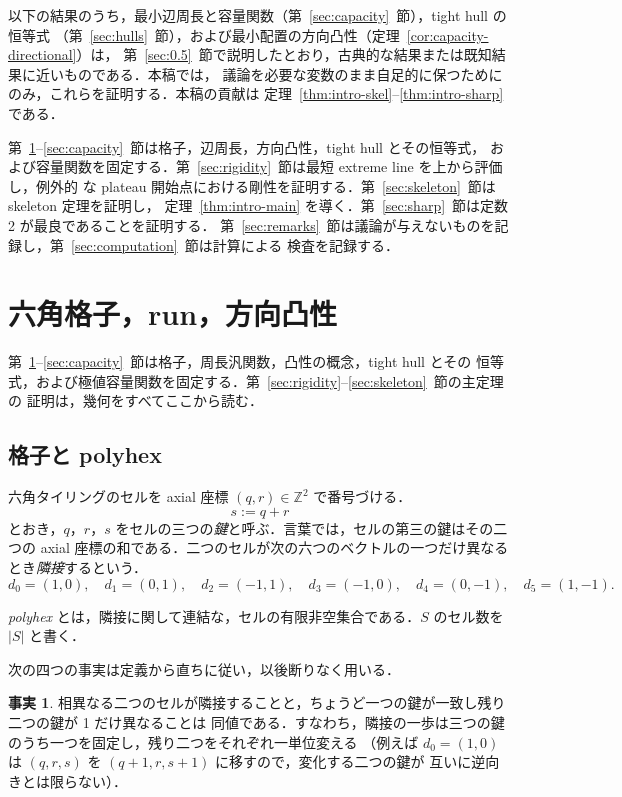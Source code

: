 \documentclass[11pt]{article}
\theoremstyle{plain}
\theoremstyle{definition}
\newtheorem{fact}[theorem]{事実}
\theoremstyle{remark}
\newcommand{\Z}{\mathbb{Z}}
\begin{document}
以下の結果のうち，最小辺周長と容量関数（第~\ref{sec:capacity}~節），tight hull の恒等式
（第~\ref{sec:hulls}~節），および最小配置の方向凸性（定理~\ref{cor:capacity-directional}）は，
第~\ref{sec:0.5}~節で説明したとおり，古典的な結果または既知結果に近いものである．本稿では，
議論を必要な変数のまま自足的に保つためにのみ，これらを証明する．本稿の貢献は
定理~\ref{thm:intro-skel}--\ref{thm:intro-sharp} である．

第~\ref{sec:prelim}--\ref{sec:capacity}~節は格子，辺周長，方向凸性，tight hull とその恒等式，
および容量関数を固定する．第~\ref{sec:rigidity}~節は最短 extreme line を上から評価し，例外的
な plateau 開始点における剛性を証明する．第~\ref{sec:skeleton}~節は skeleton 定理を証明し，
定理~\ref{thm:intro-main} を導く．第~\ref{sec:sharp}~節は定数 2 が最良であることを証明する．
第~\ref{sec:remarks}~節は議論が与えないものを記録し，第~\ref{sec:computation}~節は計算による
検査を記録する．

\section{六角格子，run，方向凸性}\label{sec:prelim}

第~\ref{sec:prelim}--\ref{sec:capacity}~節は格子，周長汎関数，凸性の概念，tight hull とその
恒等式，および極値容量関数を固定する．第~\ref{sec:rigidity}--\ref{sec:skeleton}~節の主定理の
証明は，幾何をすべてここから読む．

\subsection{格子と polyhex}\label{sec:2.1}

六角タイリングのセルを axial 座標 \((q,r)\in\Z^{2}\) で番号づける．
\[
   s:=q+r
\]
とおき，\(q\)，\(r\)，\(s\) をセルの三つの\emph{鍵}と呼ぶ．言葉では，セルの第三の鍵はその二つの
axial 座標の和である．二つのセルが次の六つのベクトルの一つだけ異なるとき\emph{隣接}するという．
\[
   d_{0}=(1,0),\quad d_{1}=(0,1),\quad d_{2}=(-1,1),\quad
   d_{3}=(-1,0),\quad d_{4}=(0,-1),\quad d_{5}=(1,-1).
\]

\emph{polyhex} とは，隣接に関して連結な，セルの有限非空集合である．\(S\) のセル数を \(|S|\)
と書く．

次の四つの事実は定義から直ちに従い，以後断りなく用いる．

\begin{fact}\label{f:1}
相異なる二つのセルが隣接することと，ちょうど一つの鍵が一致し残り二つの鍵が 1 だけ異なることは
同値である．すなわち，隣接の一歩は三つの鍵のうち一つを固定し，残り二つをそれぞれ一単位変える
（例えば \(d_{0}=(1,0)\) は \((q,r,s)\) を \((q+1,r,s+1)\) に移すので，変化する二つの鍵が
互いに逆向きとは限らない）．
\end{fact}
\end{document}
